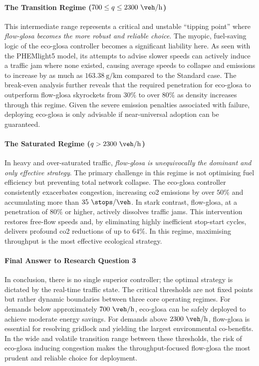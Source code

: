 \paragraph{The Transition Regime ($700 \le q \le 2300~\unit{\veh\per\hour}$)}
This intermediate range represents a critical and unstable \enquote{tipping point} where \textit{\ac{flow-glosa} becomes the more robust and reliable choice}. The myopic, fuel-saving logic of the \ac{eco-glosa} controller becomes a significant liability here. As seen with the PHEMlight5 model, its attempts to advise slower speeds can actively induce a traffic jam where none existed, causing average speeds to collapse and emissions to increase by as much as $163.38~\unit{\gram\per\kilo\metre}$ compared to the Standard case. The break-even analysis further reveals that the required penetration for \ac{eco-glosa} to outperform \ac{flow-glosa} skyrockets from $30\%$ to over $80\%$ as density increases through this regime. Given the severe emission penalties associated with failure, deploying \ac{eco-glosa} is only advisable if near-universal adoption can be guaranteed.

\paragraph{The Saturated Regime ($q > 2300~\unit{\veh\per\hour}$)}
In heavy and over-saturated traffic, \textit{\ac{flow-glosa} is unequivocally the dominant and only effective strategy}. The primary challenge in this regime is not optimising fuel efficiency but preventing total network collapse. The \ac{eco-glosa} controller consistently exacerbates congestion, increasing \ac{co2} emissions by over $50\%$ and accumulating more than $35~\unit{\stops\per\veh}$. In stark contrast, \ac{flow-glosa}, at a penetration of $80\%$ or higher, actively dissolves traffic jams. This intervention restores free-flow speeds and, by eliminating highly inefficient stop-start cycles, delivers profound \ac{co2} reductions of up to $64\%$. In this regime, maximising throughput is the most effective ecological strategy.

\paragraph{Final Answer to Research Question 3}
In conclusion, there is no single superior controller; the optimal strategy is dictated by the real-time traffic state. The critical thresholds are not fixed points but rather dynamic boundaries between three core operating regimes. For demands below approximately $700~\unit{\veh\per\hour}$, \ac{eco-glosa} can be safely deployed to achieve moderate energy savings. For demands above $2300~\unit{\veh\per\hour}$, \ac{flow-glosa} is essential for resolving gridlock and yielding the largest environmental co-benefits. In the wide and volatile transition range between these thresholds, the risk of \ac{eco-glosa} inducing congestion makes the throughput-focused \ac{flow-glosa} the most prudent and reliable choice for deployment.


